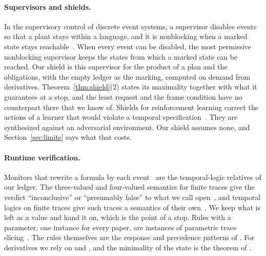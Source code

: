 \documentclass[acmsmall,nonacm,screen]{acmart}
\begin{document}
\paragraph{Supervisors and shields.} In the supervisory control of discrete event systems,
a supervisor disables events so that a plant stays within a language, and it is nonblocking
when a marked state stays reachable~\cite{ramadge1987}. When every event can be disabled,
the most permissive nonblocking supervisor keeps the states from which a marked state can
be reached. Our shield is this supervisor for the product of a plan and the obligations,
with the empty ledger as the marking, computed on demand from derivatives.
Theorem~\ref{thm:shield}(2) states its maximality together with what it guarantees at a
stop, and the least request and the frame condition have no counterpart there that we know
of. Shields for reinforcement learning correct the actions of a learner that would violate
a temporal specification~\cite{alshiekh2018}. They are synthesized against an adversarial
environment. Our shield assumes none, and Section~\ref{sec:limits} says what that costs.

\paragraph{Runtime verification.} Monitors that rewrite a formula by each
event~\cite{havelund2001} are the temporal-logic relatives of our ledger. The three-valued
and four-valued semantics for finite traces give the verdict ``inconclusive'' or
``presumably false'' to what we call open~\cite{bauer2011,bauer2010}, and temporal logics
on finite traces give such traces a semantics of their own~\cite{degiacomo2013}. We keep
what is left as a value and hand it on, which is the point of a stop. Rules with a parameter,
one instance for every paper, are instances of parametric trace slicing~\cite{chen2009}.
The rules themselves are the response and precedence patterns of \citet{dwyer1999}. For
derivatives we rely on \citet{brzozowski1964} and \citet{owens2009}, and the minimality of
the state is the theorem of \citet{nerode1958}.
\end{document}
